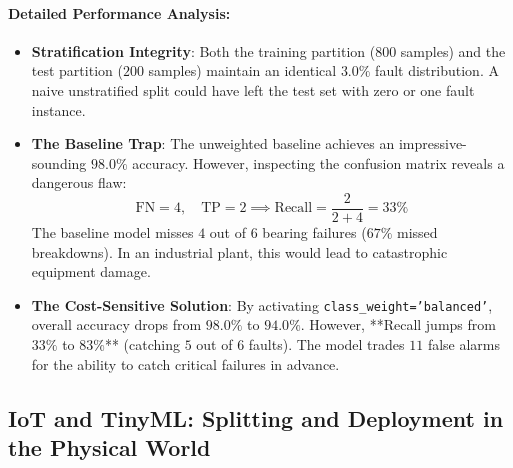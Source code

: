 \paragraph{Detailed Performance Analysis:}
\begin{itemize}
    \item \textbf{Stratification Integrity}: Both the training partition ($800$ samples) and the test partition ($200$ samples) maintain an identical $3.0\%$ fault distribution. A naive unstratified split could have left the test set with zero or one fault instance.
    \item \textbf{The Baseline Trap}: The unweighted baseline achieves an impressive-sounding $98.0\%$ accuracy. However, inspecting the confusion matrix reveals a dangerous flaw:
    \begin{equation*}
    \text{FN} = 4, \quad \text{TP} = 2 \implies \text{Recall} = \frac{2}{2 + 4} = 33\%
    \end{equation*}
    The baseline model misses $4$ out of $6$ bearing failures ($67\%$ missed breakdowns). In an industrial plant, this would lead to catastrophic equipment damage.
    \item \textbf{The Cost-Sensitive Solution}: By activating \texttt{class\_weight='balanced'}, overall accuracy drops from $98.0\%$ to $94.0\%$. However, **Recall jumps from $33\%$ to $83\%$** (catching $5$ out of $6$ faults). The model trades $11$ false alarms for the ability to catch critical failures in advance.
\end{itemize}

\subsection{IoT and TinyML: Splitting and Deployment in the Physical World}\label{subsec:splitting_iot}

